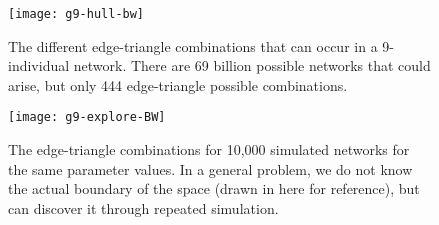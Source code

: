 \documentclass[12pt]{article}
\begin{document}
\newpage
\begin{figure}[ht!]
\centering
\texttt{[image: g9-hull-bw]}
\caption{The different edge-triangle combinations that can occur in a 9-individual network.  
There are 69 billion possible networks that could arise, but only 444 edge-triangle 
possible combinations.}
\label{F:g9-hull}

\texttt{[image: g9-explore-BW]}
\caption{The edge-triangle combinations for 10,000 simulated networks for the same
parameter values.  In a general problem, we do not know the actual boundary of the 
space (drawn in here for reference), but can discover it through repeated simulation.}
\label{F:g9-sample}
\end{figure}

\newpage
%




%

%


%

% 
\end{document}
